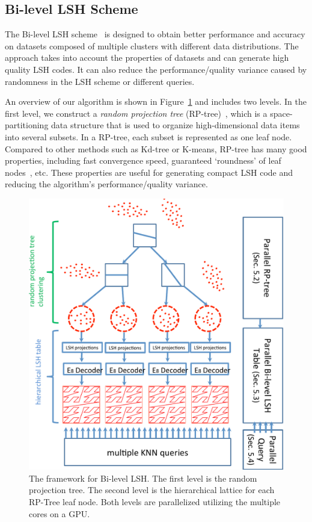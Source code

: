 \subsection{Bi-level LSH Scheme}
\label{sec:6:overview:lsh}
The Bi-level LSH scheme~\cite{BilevelLSH2011} is designed to obtain better performance and accuracy on datasets composed of multiple clusters with different data distributions. The approach takes into account the properties of datasets and can generate high quality LSH codes. It can also reduce the performance/quality variance caused by randomness in the LSH scheme or different queries.

An overview of our algorithm is shown in Figure~\ref{fig:6:overview} and includes two levels.
In the first level, we construct a \emph{random projection tree} (RP-tree)~\cite{yoav:nips:2007,Dasgupta:2008}, which is a space-partitioning data structure that is used to organize high-dimensional data items into several subsets. In a RP-tree, each subset is represented as one leaf node. Compared to other methods such as Kd-tree or K-means, RP-tree has many good properties, including fast convergence speed, guaranteed `roundness' of leaf nodes~\cite{Dasgupta:2008,aman:nips:2010}, etc. These properties are useful for generating compact LSH code and reducing the algorithm's performance/quality variance.
\begin{figure}[t]
  \centering
  \includegraphics[width=0.8\linewidth]{figs/6/overview.pdf}
  \caption[Bi-level LSH framework]{\label{fig:6:overview} The framework for Bi-level LSH. The first level is the random projection tree. The second level is the hierarchical lattice for each RP-Tree leaf node. Both levels are parallelized utilizing the multiple cores on a GPU. }
\end{figure}
